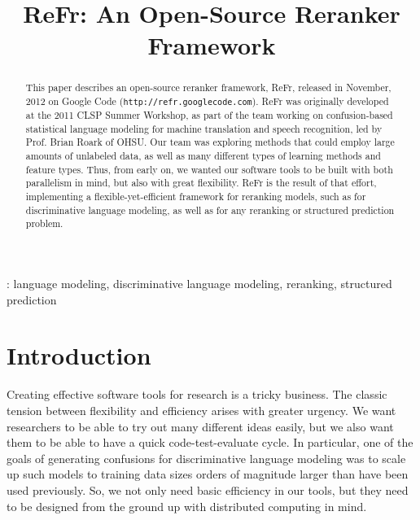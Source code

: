 \documentclass[a4paper]{article}
\title{ReFr: An Open-Source Reranker Framework}
\begin{document}
\maketitle
%
\begin{abstract}
This paper describes an open-source reranker framework, ReFr, released
in November, 2012 on Google Code
(\texttt{http://refr.googlecode.com}).  ReFr was originally developed
at the 2011 CLSP Summer Workshop, as part of the team working on
confusion-based statistical language modeling for machine translation
and speech recognition, led by Prof. Brian Roark of OHSU.  Our team
was exploring methods that could employ large amounts of unlabeled
data, as well as many different types of learning methods and feature
types.  Thus, from early on, we wanted our software tools to be built
with both parallelism in mind, but also with great flexibility.  ReFr
is the result of that effort, implementing a flexible-yet-efficient
framework for reranking models, such as for discriminative language
modeling, as well as for any reranking or structured prediction
problem.
\end{abstract}
: language modeling, discriminative language modeling, reranking, structured prediction



%
\section{Introduction}

Creating effective software tools for research is a tricky business.
The classic tension between flexibility and efficiency arises with
greater urgency. We want researchers to be able to try out many different
ideas easily, but we also want them to be able to have a quick code-test-evaluate
cycle. In particular, one of the goals of generating confusions for
discriminative language modeling was to scale up such models to training
data sizes orders of magnitude larger than have been used previously.
So, we not only need basic efficiency in our tools, but they need
to be designed from the ground up with distributed computing in mind.
\end{document}
